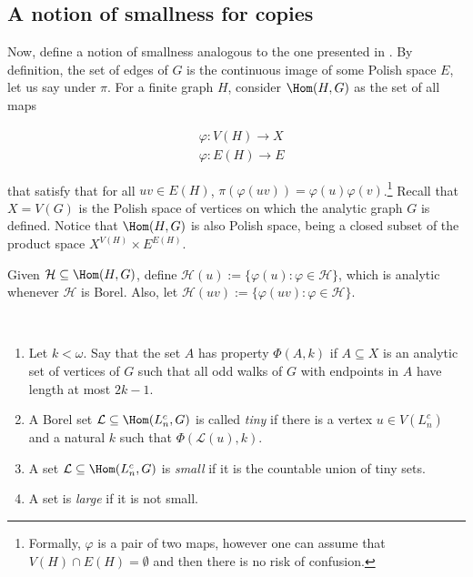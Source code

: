 \subsection{A notion of smallness for copies}\label{sec:notion-smallness}

Now, define a notion of smallness analogous to the one presented in \cite{Bernshteyn2024}.
By definition, the set of edges of $G$ is the continuous image of some Polish space $E$, let us say under $\pi$.
For a finite graph $H$, consider $\Hom(H,G)$ as the set of all maps

\begin{align*}
    &\varphi\colon V(H)\to X\\
    &\varphi\colon E(H)\to E
\end{align*}

that satisfy that for all $uv\in E(H)$, $\pi(\varphi(uv))=\varphi(u)\varphi(v)$.\footnote{Formally, $\varphi$ is a pair of two maps, however one can assume that $V(H)\cap E(H)=\emptyset$ and then there is no risk of confusion.}
Recall that $X=V(G)$ is the Polish space of vertices on which the analytic graph $G$ is defined.
Notice that $\Hom(H,G)$ is also Polish space, being a closed subset of the product space $X^{V(H)}\times E^{E(H)}$.

Given $\mathcal H\subseteq\Hom(H,G)$, define $\mathcal H(u):=\{\varphi(u):\varphi\in\mathcal H\}$, which is analytic whenever $\mathcal H$ is Borel.
Also, let $\mathcal H(uv):=\{\varphi(uv):\varphi\in\mathcal H\}$.

\begin{definition}\label{def:small}~ 
\begin{enumerate}
    \item Let $k<\omega$.
    Say that the set $A$ has property $\Phi(A,k)$ if $A\subseteq X$ is an analytic set of vertices of $G$ such that all odd walks of $G$ with endpoints in $A$ have length at most $2k-1$.

    \item A Borel set $\mathcal L\subseteq\Hom(L^c_n,G)$ is called \emph{tiny} if there is a vertex $u\in V(L^c_n)$ and a natural $k$ such that $\Phi(\mathcal L(u),k)$.

    \item A set $\mathcal L\subseteq\Hom(L^c_n,G)$ is \emph{small} if it is the countable union of tiny sets.

    \item A set is \emph{large} if it is not small.
\end{enumerate}
\end{definition}

